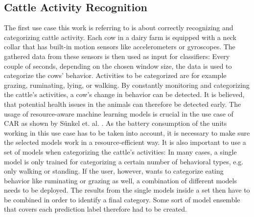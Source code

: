 \subsection{Cattle Activity Recognition}

The first use case this work is referring to is about correctly recognizing and categorizing cattle activity. Each cow in a dairy farm is equipped with a neck collar that has built-in motion sensors like accelerometers or gyroscopes. The gathered data from these sensors is then used as input for classifiers: Every couple of seconds, depending on the chosen window size, the data is used to categorize the cows’ behavior. Activities to be categorized are for example grazing, ruminating, lying, or walking. By constantly monitoring and categorizing the cattle’s activities, a cow’s change in behavior can be detected. It is believed, that potential health issues in the animals can therefore be detected early. The usage of resource-aware machine learning models is crucial in the use case of CAR as shown by Sünkel et. al. \cite{sunkel2022}. As the battery consumption of the units working in this use case has to be taken into account, it is necessary to make sure the selected models work in a resource-efficient way. It is also important to use a set of models when categorizing the cattle’s activities: In many cases, a single model is only trained for categorizing a certain number of behavioral types, e.g. only walking or standing. If the user, however, wants to categorize eating behavior like ruminating or grazing as well, a combination of different models needs to be deployed. The results from the single models inside a set then have to be combined in order to identify a final category. Some sort of model ensemble that covers each prediction label therefore had to be created.

